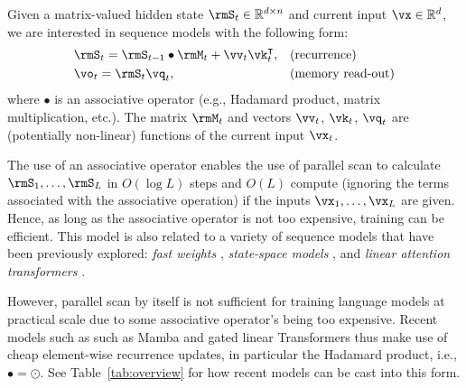 


Given a matrix-valued hidden state $\rmS_t \in \mathbb{R}^{d \times n}$ and current input $\vx \in \mathbb{R}^{d}$, we are interested in sequence models with the following form:
\begin{align*}
    &\rmS_t =   \rmS_{t-1} \bullet \rmM_t  + \vv_t  \vk_t^\intercal, && \text{(recurrence)} \\ &\vo_t = \rmS_t \vq_t,  && \text{(memory read-out)}
\end{align*}
where $\bullet$ is an associative operator (e.g., Hadamard product, matrix multiplication, etc.). The matrix $\rmM_t$ and vectors $\vv_t$, $\vk_t$, $\vq_t$  are (potentially non-linear) functions of the current input $\vx_t$. 

The use of an associative operator enables the use of parallel scan to calculate $\rmS_1, \dots, \rmS_L$ in $O(\log L)$ steps and $O(L)$ compute (ignoring the terms associated with the  associative operation)   if the inputs  $\vx_1, \dots, \vx_L$ are given. Hence, as long as the associative operator is not too expensive, training can be efficient. This model is also related to a variety of sequence models that have been previously explored: \textit{fast weights} \cite[][\textit{i.a.}]{hinton_using_1987,schmidhuber_learning_1992,ba_using_2016,schlag_linear_2021,irie_going_2021,mao_fine-tuning_2022},  \textit{state-space models} \cite[][\textit{i.a.}]{hasani2022liquid,fu_hungry_2023,mehta_long_2023,smith_simplified_2023,gu_mamba_2023}, and \textit{linear attention transformers} \cite[][\textit{i.a.}]{katharopoulos_transformers_2020,peng_random_2021,choromanski_rethinking_2021,sun2023retentive,pramanik_recurrent_2023,yang_gated_2023}. 

However,  parallel scan by itself is not sufficient for  training language models at practical scale due to  some associative operator's  being too expensive. Recent models such as such as Mamba \cite{gu_mamba_2023} and gated linear Transformers \cite{sun2023retentive,yang_gated_2023,qin_hgrn2_2024,peng_eagle_2024,beck2024xlstm}  thus make use of cheap element-wise recurrence updates, in particular the Hadamard product, i.e., $\bullet = \odot$. See Table~\ref{tab:overview} for how recent models can be cast into this form. 

